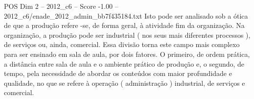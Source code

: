 \begin{textsample}{POS Dim 2 – 2012\_c6 – Score -1.00 – 2012\_c6/enade\_2012\_admin\_bb7f435184.txt}
Isto pode ser analisado sob a ótica de que a produção refere -se, de forma geral, à atividade fim da organização.
Na organização, a produção pode ser industrial ( nos seus mais diferentes processos ), de serviços ou, ainda, comercial.
Essa divisão torna este campo mais complexo para ser ensinado em sala de aula, por dois fatores.
O primeiro, de ordem prática, a distância entre sala de aula e o ambiente prático de produção e, o segundo, de tempo, pela necessidade de abordar os conteúdos com maior profundidade e qualidade, no que se refere à operação ( administração ) industrial, de serviços e comercial.

\end{textsample}
